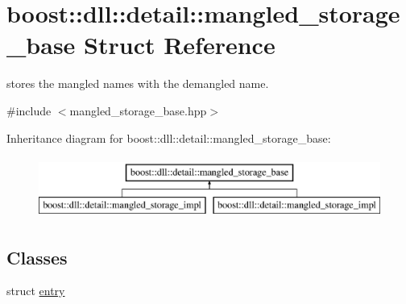 \hypertarget{a00213}{}\section{boost\+:\+:dll\+:\+:detail\+:\+:mangled\+\_\+storage\+\_\+base Struct Reference}
\label{a00213}


stores the mangled names with the demangled name.  




{\ttfamily \#include $<$mangled\+\_\+storage\+\_\+base.\+hpp$>$}

Inheritance diagram for boost\+:\+:dll\+:\+:detail\+:\+:mangled\+\_\+storage\+\_\+base\+:\begin{figure}[H]
\begin{center}
\leavevmode
\includegraphics[height=2.000000cm]{a00213}
\end{center}
\end{figure}
\subsection*{Classes}
\begin{DoxyCompactItemize}
\item 
struct \hyperlink{a00097}{entry}
\end{DoxyCompactItemize}
